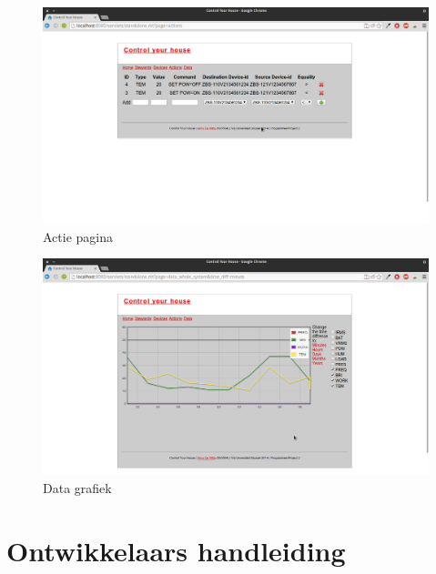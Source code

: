 \documentclass{article}
\begin{document}
\begin{figure}[htp]
\centering
\includegraphics[scale=0.30]{Screenshot4.png}
\caption{Actie pagina}
\label{screen4}
\end{figure}
\begin{figure}[htp]
\centering
\includegraphics[scale=0.30]{Screenshot5.png}
\caption{Data grafiek}
\label{screen5}
\end{figure}

\newpage

\section{Ontwikkelaars handleiding}
\label{sec:developers}
\end{document}
